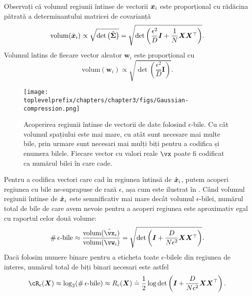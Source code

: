 \documentclass[../../book-main_ro.tex]{subfiles}
\begin{document}
Observați că volumul regiunii întinse de vectorii $\bm{x}_i$ este proporțional cu rădăcina pătrată a determinantului matricei de covarianță
\begin{equation}
	\mbox{volum}(\hat {\bm{x}}_i) \propto \sqrt{\det \big(\hat{\boldsymbol{\Sigma}}\big)} = \sqrt{\det\left(\frac{\epsilon^2}{D} \boldsymbol{I} + \frac{1}{N} \bm{X}\bm{X}^\top \right)}.
\end{equation}
Volumul întins de fiecare vector aleator $\boldsymbol{w}_i$ este proporțional cu
\begin{equation}
	\mbox{volum}(\boldsymbol{w}_i) \propto   \sqrt{\det\left(\frac{\epsilon^2}{D} \boldsymbol{I} \right)}.
\end{equation}

\begin{figure}
	\centering
	\texttt{[image: \\toplevelprefix/chapters/chapter3/figs/Gaussian-compression.png]}
	\caption{Acoperirea regiunii întinse de vectorii de date folosind $\epsilon$-bile. Cu cât volumul spațiului este mai mare, cu atât sunt necesare mai multe bile, prin urmare sunt necesari mai mulți biți pentru a codifica și enumera bilele. Fiecare vector cu valori reale $\vx$ poate fi codificat ca numărul bilei în care cade.}
	\label{fig:ball-packing}
\end{figure}

Pentru a codifica vectori care cad în regiunea întinsă de $\hat {\bm{x}}_i$, putem acoperi regiunea cu bile ne-suprapuse de rază $\epsilon$, așa cum este ilustrat în . Când volumul regiunii întinse de $\hat {\bm{x}}_i$ este semnificativ mai mare decât volumul $\epsilon$-bilei, numărul total de bile de care avem nevoie pentru a acoperi regiunea este aproximativ egal cu raportul celor două volume:
\begin{equation}
	\# \,\epsilon\mbox{-bile} \approx \frac{\mbox{volum}(\hat \vx_i)}{\mbox{volum}(\vw_i)} = \sqrt{\det\left(\boldsymbol{I} + \frac{D}{N\epsilon^2} \X\X^\top  \right)}.
\end{equation}
Dacă folosim numere binare pentru a eticheta toate $\epsilon$-bilele din regiunea de interes, numărul total de biți binari necesari este astfel
\begin{equation} 
	\cR_{\epsilon}(\X) \approx \log_2 (\# \,\epsilon\mbox{-bile}) \approx R_{\epsilon}(\X) \doteq \frac{1}{2} \log \det \left(\boldsymbol{I} + \frac{D}{N\epsilon^2} \X\X^\top \right).
	\label{eqn:rate-Gaussian}
\end{equation}
\end{document}
